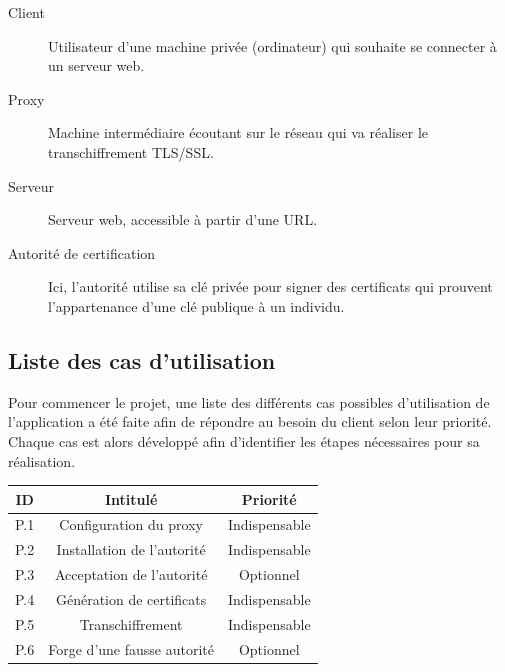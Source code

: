 \documentclass[a4paper,11pt,french]{article}
\begin{document}
\begin{description}
\item[Client] Utilisateur d'une machine privée (ordinateur) qui souhaite se connecter à un serveur web.
\item[Proxy] Machine intermédiaire écoutant sur le réseau qui va réaliser le transchiffrement TLS/SSL.
\item[Serveur] Serveur web, accessible à partir d'une URL.
\item[Autorité de certification] Ici, l'autorité utilise sa clé privée pour signer des certificats qui prouvent l'appartenance d'une clé publique à un individu.

\end{description}

\subsection{Liste des cas d'utilisation}

Pour commencer le projet, une liste des différents cas possibles d’utilisation de l’application a été faite afin de répondre au besoin du client selon leur priorité. Chaque cas est alors développé afin d’identifier les étapes nécessaires pour sa réalisation. 

\begin{center}
\begin{tabular}{|c|c|c|}
\hline 
ID & Intitulé & Priorité \\ 
\hline 
P.1 & Configuration du proxy  & Indispensable \\ 
\hline 
P.2 & Installation de l'autorité & Indispensable \\ 
\hline 
P.3 & Acceptation de l'autorité & Optionnel \\ 
\hline 
P.4 & Génération de certificats & Indispensable \\ 
\hline 
P.5 & Transchiffrement & Indispensable \\ 
\hline 
P.6 & Forge d'une fausse autorité & Optionnel \\ 
\hline 
\end{tabular} 
\end{center}
~~\\
~~\\

\huge
\end{document}
